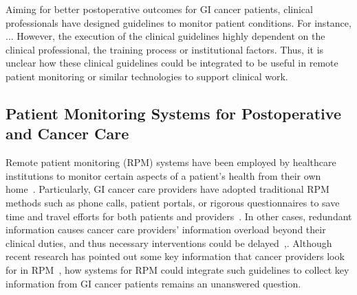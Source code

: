 Aiming for better postoperative outcomes for GI cancer patients, clinical professionals have designed guidelines to monitor patient conditions. For instance, ... 
However, the execution of the clinical guidelines highly dependent on the clinical professional, the training process or institutional factors. Thus, it is unclear how these clinical guidelines could be integrated to be useful in remote patient monitoring or similar technologies to support clinical work.

\subsection{Patient Monitoring Systems for Postoperative and Cancer Care}
\label{sub:related_work-2}
Remote patient monitoring (RPM) systems have been employed by healthcare institutions to monitor certain aspects of a patient's health from their own home~\cite{malasingheRemotePatientMonitoring2019}. 
Particularly, GI cancer care providers have adopted traditional RPM methods such as phone calls, patient portals, or rigorous questionnaires to save time and travel efforts for both patients and providers~\cite{malasingheRemotePatientMonitoring2019}.
In other cases, redundant information causes cancer care providers' information overload beyond their clinical duties, and thus necessary interventions could be delayed~\cite{clark_understanding_2021, bhat_infrastructuring_2021, yangWishThereWere2024},.
Although recent research has pointed out some key information that cancer providers look for in RPM~\cite{yangWishThereWere2024}, 
how systems for RPM could integrate such guidelines to collect key information from GI cancer patients remains an unanswered question.

